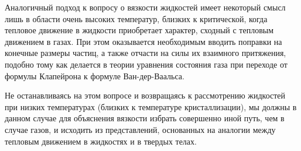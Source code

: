 \documentclass[a4paper, 12pt]{article}
\begin{document}
Аналогичный подход к вопросу о вязкости жидкостей имеет некоторый смысл лишь в области очень высоких температур, близких 
к критической, когда тепловое движение в жидкости приобретает характер, сходный с тепловым движением в газах. 
При этом оказывается необходимым вводить поправки на конечные размеры частиц, а также отчасти на силы их взаимного 
притяжения, подобно тому как делается в теории уравнения состояния газа при переходе от формулы Клапейрона к формуле Ван-дер-Ваальса.

Не останавливаясь на этом вопросе и возвращаясь к рассмотрению жидкостей при низких температурах 
(близких к температуре кристаллизации), мы должны в данном случае для объяснения вязкости избрать совершенно иной путь, 
чем в случае газов, и исходить из представлений, основанных на аналогии между тепловым движением в жидкостях и в твердых телах.
\end{document}
